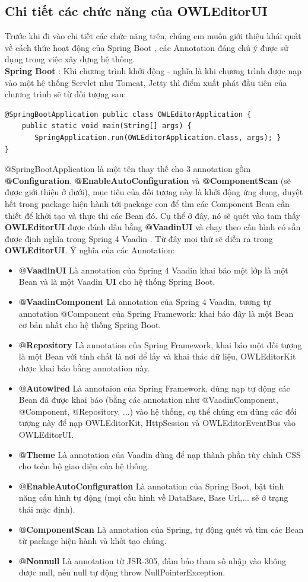 \subsection{Chi tiết các chức năng của OWLEditorUI}
Trước khi đi vào chi tiết các chức năng trên, chúng em muốn giới thiệu khái quát về cách thức hoạt động của Spring Boot \cite{springboot}, các Annotation đáng chú ý được sử dụng trong việc xây dựng hệ thống.
\\
\textbf{Spring Boot} : Khi chương trình khởi động - nghĩa là khi chương trình được nạp vào một hệ thống Servlet như Tomcat, Jetty thì điểm xuất phát đầu tiên của chương trình sẽ từ đối tượng sau:
\begin{verbatim}
@SpringBootApplication public class OWLEditorApplication {
    public static void main(String[] args) {
       SpringApplication.run(OWLEditorApplication.class, args); }
}
\end{verbatim} 
@SpringBootApplication là một tên thay thế cho 3 annotation gồm \textbf{@Configuration}, \textbf{@EnableAutoConfiguration} và \textbf{@ComponentScan} (sẽ được giới thiệu ở dưới), mục tiêu của đối tượng này là khởi động ứng dụng, duyệt hết trong package hiện hành tới package con để tìm các Component Bean cần thiết để khởi tạo và thực thi các Bean đó. Cụ thể ở đây, nó sẽ quét vào tam thấy \textbf{OWLEditorUI} được đánh dấu bằng \textbf{@VaadinUI} và chạy theo cấu hình có sẵn được định nghĩa trong Spring 4 Vaadin \cite{spring4vaadin}. Từ đây mọi thứ sẽ diễn ra trong \textbf{OWLEditorUI}. Ý nghĩa của các Annotation:
\begin{itemize}	
\item \textbf{@VaadinUI} Là annotation của Spring 4 Vaadin \cite{spring4vaadin} khai báo một lớp là một Bean và là một Vaadin \textbf{UI} cho hệ thống Spring Boot.
\item \textbf{@VaadinComponent} Là annotation của Spring 4 Vaadin, tương tự annotation @Component của Spring Framework: khai báo đây là một Bean cơ bản nhất cho hệ thống Spring Boot.
\item \textbf{@Repository} Là annotation của Spring Framework, khai báo một đối tượng là một Bean với tính chất là nơi để lấy và khai thác dữ liệu, OWLEditorKit được khai báo bằng annotation này.
\item \textbf{@Autowired} Là annotaion của Spring Framework, dùng nạp tự động các Bean đã được khai báo (bằng các annotation như @VaadinComponent, @Component, @Repository, ...) vào hệ thống, cụ thể chúng em dùng các đối tượng này để nạp OWLEditorKit, HttpSession và OWLEditorEventBus vào OWLEditorUI.
\item \textbf{@Theme} Là annotation của Vaadin dùng để nạp thành phần tùy chỉnh CSS cho toàn bộ giao diện của hệ thống.
\item \textbf{@EnableAutoConfiguration} Là annotation của Spring Boot, bật tính năng cấu hình tự động (mọi cấu hình về DataBase, Base Url,... sẽ ở trạng thái mặc định).
\item \textbf{@ComponentScan} Là annotation của Spring, tự động quét và tìm các Bean từ package hiện hành và khởi tạo chúng.
\item \textbf{@Nonnull} Là annotation từ JSR-305, đảm bảo tham số nhập vào không được null, nếu null tự động throw NullPointerException.
\end{itemize}
